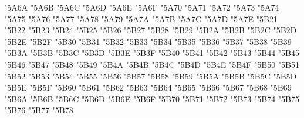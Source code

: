{\Uchar\jis"5A6A %
\Uchar\jis"5A6B %
\Uchar\jis"5A6C %
\Uchar\jis"5A6D %
\Uchar\jis"5A6E %
\Uchar\jis"5A6F %
\Uchar\jis"5A70 %
\Uchar\jis"5A71 %
\Uchar\jis"5A72 %
\Uchar\jis"5A73 %
\Uchar\jis"5A74 %
\Uchar\jis"5A75 %
\Uchar\jis"5A76 %
\Uchar\jis"5A77 %
\Uchar\jis"5A78 %
\Uchar\jis"5A79 %
\Uchar\jis"5A7A %
\Uchar\jis"5A7B %
\Uchar\jis"5A7C %
\Uchar\jis"5A7D %
\Uchar\jis"5A7E %
\Uchar\jis"5B21 %
\Uchar\jis"5B22 %
\Uchar\jis"5B23 %
\Uchar\jis"5B24 %
\Uchar\jis"5B25 %
\Uchar\jis"5B26 %
\Uchar\jis"5B27 %
\Uchar\jis"5B28 %
\Uchar\jis"5B29 %
\Uchar\jis"5B2A %
\Uchar\jis"5B2B %
\Uchar\jis"5B2C %
\Uchar\jis"5B2D %
\Uchar\jis"5B2E %
\Uchar\jis"5B2F %
\Uchar\jis"5B30 %
\Uchar\jis"5B31 %
\Uchar\jis"5B32 %
\Uchar\jis"5B33 %
\Uchar\jis"5B34 %
\Uchar\jis"5B35 %
\Uchar\jis"5B36 %
\Uchar\jis"5B37 %
\Uchar\jis"5B38 %
\Uchar\jis"5B39 %
\Uchar\jis"5B3A %
\Uchar\jis"5B3B %
\Uchar\jis"5B3C %
\Uchar\jis"5B3D %
\Uchar\jis"5B3E %
\Uchar\jis"5B3F %
\Uchar\jis"5B40 %
\Uchar\jis"5B41 %
\Uchar\jis"5B42 %
\Uchar\jis"5B43 %
\Uchar\jis"5B44 %
\Uchar\jis"5B45 %
\Uchar\jis"5B46 %
\Uchar\jis"5B47 %
\Uchar\jis"5B48 %
\Uchar\jis"5B49 %
\Uchar\jis"5B4A %
\Uchar\jis"5B4B %
\Uchar\jis"5B4C %
\Uchar\jis"5B4D %
\Uchar\jis"5B4E %
\Uchar\jis"5B4F %
\Uchar\jis"5B50 %
\Uchar\jis"5B51 %
\Uchar\jis"5B52 %
\Uchar\jis"5B53 %
\Uchar\jis"5B54 %
\Uchar\jis"5B55 %
\Uchar\jis"5B56 %
\Uchar\jis"5B57 %
\Uchar\jis"5B58 %
\Uchar\jis"5B59 %
\Uchar\jis"5B5A %
\Uchar\jis"5B5B %
\Uchar\jis"5B5C %
\Uchar\jis"5B5D %
\Uchar\jis"5B5E %
\Uchar\jis"5B5F %
\Uchar\jis"5B60 %
\Uchar\jis"5B61 %
\Uchar\jis"5B62 %
\Uchar\jis"5B63 %
\Uchar\jis"5B64 %
\Uchar\jis"5B65 %
\Uchar\jis"5B66 %
\Uchar\jis"5B67 %
\Uchar\jis"5B68 %
\Uchar\jis"5B69 %
\Uchar\jis"5B6A %
\Uchar\jis"5B6B %
\Uchar\jis"5B6C %
\Uchar\jis"5B6D %
\Uchar\jis"5B6E %
\Uchar\jis"5B6F %
\Uchar\jis"5B70 %
\Uchar\jis"5B71 %
\Uchar\jis"5B72 %
\Uchar\jis"5B73 %
\Uchar\jis"5B74 %
\Uchar\jis"5B75 %
\Uchar\jis"5B76 %
\Uchar\jis"5B77 %
\Uchar\jis"5B78 %
}
